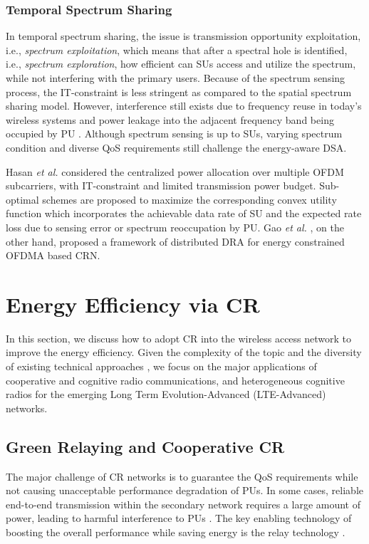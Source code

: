 \documentclass[journal,12pt,onecolumn]{IEEEtran}
\begin{document}
\subsubsection{Temporal Spectrum Sharing}
In temporal spectrum sharing, the issue is transmission opportunity exploitation, i.e., \emph{spectrum exploitation}, which means that after a spectral hole is identified, i.e., \emph{spectrum exploration}, how efficient can SUs access and utilize the spectrum, while not interfering with the primary users. Because of the spectrum sensing process, the IT-constraint is less stringent as compared to the spatial spectrum sharing model. However, interference still exists due to frequency reuse in today's wireless systems and power leakage into the adjacent frequency band being occupied by PU \cite{5351726}. Although spectrum sensing is up to SUs, varying spectrum condition and diverse QoS requirements still challenge the energy-aware DSA.

Hasan \emph{et al.} \cite{5351726} considered the centralized power allocation over multiple OFDM subcarriers, with IT-constraint and limited transmission power budget. Sub-optimal schemes are proposed to maximize the corresponding convex utility function which incorporates the achievable data rate of SU and the expected rate loss due to sensing error or spectrum reoccupation by PU. Gao \emph{et al.} \cite{5288955}, on the other hand, proposed a framework of distributed DRA for energy constrained OFDMA based CRN.

 \section{Energy Efficiency via CR}

In this section, we discuss how to adopt CR into the wireless access network to improve the energy efficiency. Given the complexity of the topic and the diversity of existing technical approaches \cite{5723803}, we focus on the major applications of cooperative and cognitive radio communications, and heterogeneous cognitive radios for the emerging Long Term Evolution-Advanced (LTE-Advanced) networks. 


\subsection{Green Relaying and Cooperative CR}
The major challenge of CR networks is to guarantee the QoS requirements while not causing unacceptable performance degradation of PUs. In some cases, reliable end-to-end transmission within the secondary network requires a large amount of power, leading to harmful interference to PUs \cite{relayCR1}. The key enabling technology of boosting the overall performance while saving energy is the relay technology \cite{relayDef}. 
\end{document}

